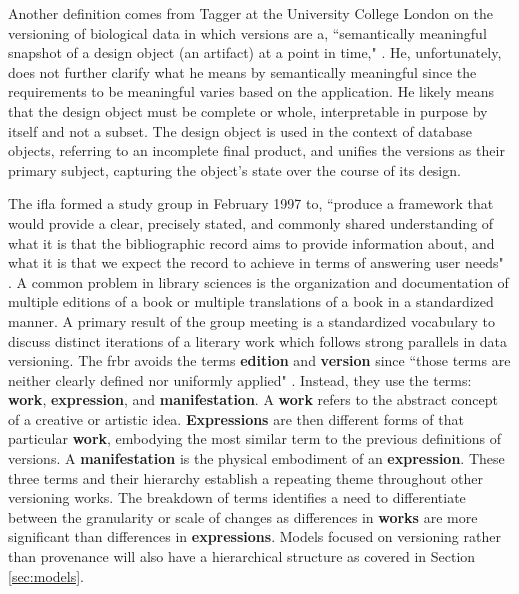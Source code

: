 Another definition comes from Tagger at the University College London on the versioning of biological data in which versions are a, ``semantically meaningful snapshot of a design object (an artifact) at a point in time," \cite{Tagger2005}.
He, unfortunately, does not further clarify what he means by semantically meaningful since the requirements to be meaningful varies based on the application.
He likely means that the design object must be complete or whole, interpretable in purpose by itself and not a subset.
The design object is used in the context of database objects, referring to an incomplete final product, and unifies the versions as their primary subject, capturing the object's state over the course of its design.

The \gls{ifla} formed a study group in February 1997 to, ``produce a framework that would provide a clear, precisely stated, and commonly shared understanding of what it is that the bibliographic record aims to provide information about, and what it is that we expect the record to achieve in
terms of answering user needs" \cite{frbr}.
A common problem in library sciences is the organization and documentation of multiple editions of a book or multiple translations of a book in a standardized manner.
A primary result of the group meeting is a standardized vocabulary to discuss distinct iterations of a literary work which follows strong parallels in data versioning.
The \gls{frbr} avoids the terms \textbf{edition} and \textbf{version} since ``those terms are neither clearly defined nor uniformly applied" \cite{frbr}.
Instead, they use the terms: \textbf{work}, \textbf{expression}, and \textbf{manifestation}.
A \textbf{work} refers to the abstract concept of a creative or artistic idea.
\textbf{Expressions} are then different forms of that particular \textbf{work}, embodying the most similar term to the previous definitions of versions.
A \textbf{manifestation} is the physical embodiment of an \textbf{expression}.
These three terms and their hierarchy establish a repeating theme throughout other versioning works.
The breakdown of terms identifies a need to differentiate between the granularity or scale of changes as differences in \textbf{works} are more significant than differences in \textbf{expressions}.
Models focused on versioning rather than provenance will also have a hierarchical structure as covered in Section \ref{sec:models}.

